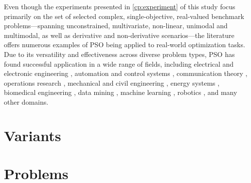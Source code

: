 {Even though the experiments presented in \autoref{cp:experiment} of this study focus primarily on the set of selected complex, single-objective, real-valued benchmark problems—spanning unconstrained, multivariate, non-linear, unimodal and multimodal, as well as derivative and non-derivative scenarios---the literature offers numerous examples of PSO being applied to real-world optimization tasks. Due to its versatility and effectiveness across diverse problem types, PSO has found successful application in a wide range of fields, including
electrical and electronic engineering \citep[e.g.,][]{jin2024improved, salvatierra2024pso, dibya2025optimized},
automation and control systems \citep[e.g.,][]{duan2024using,urgan2024pso,gil2024platooning}, 
communication theory \citep[e.g.,][]{qiao2025resource,jin2024overview,jin2025design}, 
operations research \citep[e.g.,][]{li2025ore,omran2025empirical,dong2022optimized, palaniappan2025task, simaiya2024hybrid}, 
mechanical and civil engineering \citep[e.g.,][]{ramkumar2025intelligent,wang2025optimisation,houssein2025recent}, 
energy systems \citep[e.g.,][]{bade2025multi,zhang2024energy,hamza2024optimization}, 
biomedical engineering \citep[e.g.,][]{mallik2024swarm}, 
data mining \citep[e.g.,][]{shan2024research,zuo2024knowledge,carstensen2025efficient}, 
machine learning \citep[e.g.,][]{alenezi2025hybrid,balavani2024enhanced,tijjani2024enhanced}, 
robotics \citep[e.g.,][]{sharma2025swarm,liu2025design,prakash2024swarm}, 
and many other domains. 





\section{Variants}





\section{Problems}








}
